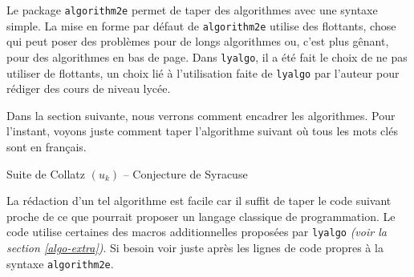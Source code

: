 Le package \verb+algorithm2e+ permet de taper des algorithmes avec une syntaxe simple. La mise en forme par défaut de \verb+algorithm2e+ utilise des flottants, chose qui peut poser des problèmes pour de longs algorithmes ou, c'est plus gênant, pour des algorithmes en bas de page. Dans \verb+lyalgo+, il a été fait le choix de ne pas utiliser de flottants, un choix lié à l'utilisation faite de \verb+lyalgo+ par l'auteur pour rédiger des cours de niveau lycée.


\medskip

Dans la section suivante, nous verrons comment encadrer les algorithmes. Pour l'instant, voyons juste comment taper l'algorithme suivant où tous les mots clés sont en français.


\bigskip


\begin{algo*}
    \caption{Suite de Collatz $(u_k)$ -- Conjecture de Syracuse}


    \BlankLine    %

\end{algo*}


\bigskip


La rédaction d'un tel algorithme est facile car il suffit de taper le code suivant proche de ce que pourrait proposer un langage classique de programmation. Le code utilise certaines des macros additionnelles proposées par \verb+lyalgo+ \emph{(voir la section \ref{algo-extra})}. Si besoin voir juste après les lignes de code propres à la syntaxe \verb+algorithm2e+.


